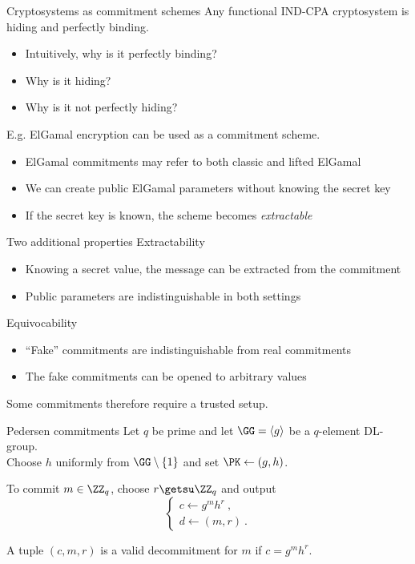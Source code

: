 \begin{frame}{Cryptosystems as commitment schemes}
  Any functional IND-CPA cryptosystem is hiding and perfectly binding.
  \begin{itemize}[<+(1)->]
    \item Intuitively, why is it perfectly binding?
    \item Why is it hiding?
    \item Why is it not perfectly hiding?
  \end{itemize}

  \vspace*{1em}

  \pause
  E.g. ElGamal encryption can be used as a commitment scheme.
  \begin{itemize}[<+(1)->]
    \item ElGamal commitments may refer to both classic and lifted ElGamal
    \item We can create public ElGamal parameters without knowing the secret key
    \item If the secret key is known, the scheme becomes \emph{extractable}
  \end{itemize}
\end{frame}

\begin{frame}{Two additional properties}
  Extractability
  \begin{itemize}[<+(1)->]
    \item Knowing a secret value, the message can be extracted from the commitment
    \item Public parameters are indistinguishable in both settings
  \end{itemize}

  \pause
  Equivocability
  \begin{itemize}[<+(1)->]
    \item \enquote{Fake} commitments are indistinguishable from real commitments
    \item The fake commitments can be opened to arbitrary values
  \end{itemize}

  \vspace*{1em}

  \pause
  Some commitments therefore require a trusted setup.
\end{frame}

\begin{frame}{Pedersen commitments}
  Let $q$ be prime and let $\GG = \langle g \rangle$ be a $q$-element DL-group.\\
  Choose $h$ uniformly from $\GG\setminus\{1\}$ and set $\PK \gets (g, h)$.

  \vfill

  \pause
  To commit $m \in \ZZ_q$, choose $r \getsu \ZZ_q$ and output
  \[
    \begin{cases}
      c \gets g^m h^r\ ,\\
      d \gets (m, r)\ .
    \end{cases}
  \]

  \vfill

  \pause
  A tuple $(c, m, r)$ is a valid decommitment for $m$ if $c = g^m h^r$.
\end{frame}

